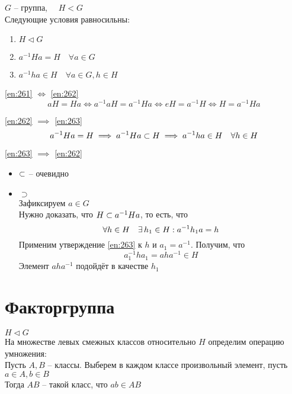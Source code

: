 \begin{theorem}
	$ G $ -- группа, $ \quad H < G $ \\
	Следующие условия равносильны:
	\begin{enumerate}
		\item\label{en:261} $ H \vartriangleleft G $
		\item\label{en:262} $ a^{-1}Ha = H \quad \forall a \in G $
		\item\label{en:263} $ a^{-1}ha \in H \quad \forall a \in G, h \in H $
	\end{enumerate}
\end{theorem}

\begin{iproof}
	\item \ref{en:261} $ \iff $ \ref{en:262}
	$$ aH = Ha \iff a^{-1}aH = a^{-1}Ha \iff eH = a^{-1}H \iff H = a^{-1}Ha $$
	\item \ref{en:262} $ \implies $ \ref{en:263}
	$$ a^{-1}Ha = H \implies a^{-1}Ha \subset H \implies a^{-1}ha \in H \quad \forall h \in H $$
	\item \ref{en:263} $ \implies $ \ref{en:262}
	\begin{itemize}
		\item $ \subset $ -- очевидно
		\item $ \supset $ \\
		Зафиксируем $ a \in G $ \\
		Нужно доказать, что $ H \subset a^{-1}Ha $, то есть, что
		$$ \forall h \in H \quad \exists\, h_1 \in H : a^{-1}h_1a = h $$
		Применим утверждение \ref{en:263} к $ h $ и $ a_1 = a^{-1} $. Получим, что
		$$ a_1^{-1}ha_1 = aha^{-1} \in H $$
		Элемент $ aha^{-1} $ подойдёт в качестве $ h_1 $
	\end{itemize}
\end{iproof}

\section{Факторгруппа}

\begin{definition}
	$ H \vartriangleleft G $ \\
	На множестве левых смежных классов относительно $ H $ определим операцию умножения: \\
	Пусть $ A, B $ -- классы. Выберем в каждом классе произвольный элемент, пусть $ a \in A, b \in B $ \\
	Тогда $ AB $ -- такой класс, что $ ab \in AB $
\end{definition}

